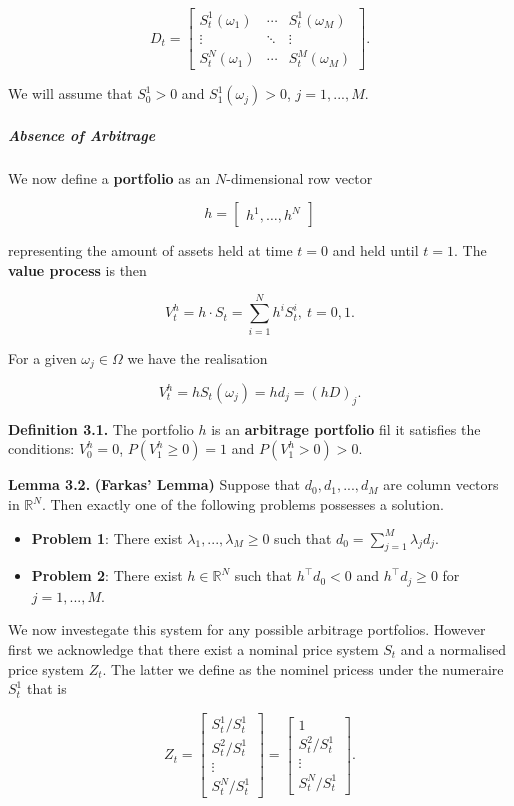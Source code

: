 \documentclass[
]{article}
\providecommand{\tightlist}{%
  \setlength{\itemsep}{0pt}\setlength{\parskip}{0pt}}
\begin{document}
\[
D_t=\begin{bmatrix} S_t^1(\omega_1)&\cdots &S_t^1(\omega_M)\\
\vdots &\ddots & \vdots\\
S_t^N(\omega_1) &\cdots&S_t^M(\omega_M)\end{bmatrix}.
\]

We will assume that \(S_0^1>0\) and \(S_1^1(\omega_j)>0\),
\(j=1,...,M\).

\hypertarget{absence-of-arbitrage}{%
\subparagraph{Absence of Arbitrage}\label{absence-of-arbitrage}}

We now define a \textbf{portfolio} as an \(N\)-dimensional row vector

\[
h=\begin{bmatrix} h^1, \dots,h^N\end{bmatrix}
\]

representing the amount of assets held at time \(t=0\) and held until
\(t=1\). The \textbf{value process} is then

\[
V^h_t=h\cdot S_t=\sum_{i=1}^N h^iS_t^i,\ t=0,1.
\]

For a given \(\omega_j\in\Omega\) we have the realisation

\[
V_t^h=hS_t(\omega_j)=hd_j=(hD)_j.
\]

\textbf{Definition 3.1.} The portfolio \(h\) is an \textbf{arbitrage
portfolio} fil it satisfies the conditions: \(V_0^h=0\),
\(P(V_1^h\ge 0)=1\) and \(P(V_1^h>0)>0\).

\textbf{Lemma 3.2.} \textbf{(Farkas' Lemma)} Suppose that
\(d_0,d_1,...,d_M\) are column vectors in \(\mathbb{R}^N\). Then exactly
one of the following problems possesses a solution.

\begin{itemize}
\tightlist
\item
  \textbf{Problem 1}: There exist \(\lambda_1,...,\lambda_M\ge0\) such
  that \(d_0=\sum_{j=1}^M\lambda_jd_j\).
\item
  \textbf{Problem 2}: There exist \(h\in\mathbb{R}^N\) such that
  \(h^\top d_0<0\) and \(h^\top d_j\ge 0\) for \(j=1,...,M\).
\end{itemize}

We now investegate this system for any possible arbitrage portfolios.
However first we acknowledge that there exist a nominal price system
\(S_t\) and a normalised price system \(Z_t\). The latter we define as
the nominel pricess under the numeraire \(S_t^1\) that is

\[
Z_t=\begin{bmatrix} S_t^1/S_t^1\\
S_t^2/S_t^1\\
\vdots\\
S_t^N/S_t^1\end{bmatrix}=\begin{bmatrix} 1\\
S_t^2/S_t^1\\
\vdots\\
S_t^N/S_t^1\end{bmatrix}.
\]
\end{document}

